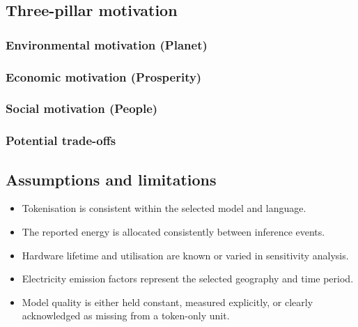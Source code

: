 \documentclass[11pt,a4paper]{article}
\begin{document}
\subsection{Three-pillar motivation}

\subsubsection{Environmental motivation (Planet)}

\subsubsection{Economic motivation (Prosperity)}

\subsubsection{Social motivation (People)}

\subsubsection{Potential trade-offs}

\subsection{Assumptions and limitations}
\begin{itemize}[leftmargin=*]
    \item Tokenisation is consistent within the selected model and language.
    \item The reported energy is allocated consistently between inference events.
    \item Hardware lifetime and utilisation are known or varied in sensitivity
    analysis.
    \item Electricity emission factors represent the selected geography and time
    period.
    \item Model quality is either held constant, measured explicitly, or clearly
    acknowledged as missing from a token-only unit.
\end{itemize}
\end{document}
